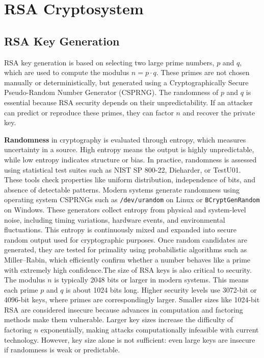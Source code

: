 \chapter{RSA Cryptosystem}
\section{RSA Key Generation }
RSA key generation is based on selecting two large prime numbers, \( p \) and \( q \), which are used to compute the modulus \( n = p \cdot q \). These primes are not chosen manually or deterministically, but generated using a Cryptographically Secure Pseudo-Random Number Generator (CSPRNG). The randomness of \( p \) and \( q \) is essential because RSA security depends on their unpredictability. If an attacker can predict or reproduce these primes, they can factor \( n \) and recover the private key.

\textbf{Randomness} in cryptography is evaluated through entropy, which measures uncertainty in a source. High entropy means the output is highly unpredictable, while low entropy indicates structure or bias. In practice, randomness is assessed using statistical test suites such as NIST SP 800-22, Dieharder, or TestU01. These tools check properties like uniform distribution, independence of bits, and absence of detectable patterns.
Modern systems generate randomness using operating system CSPRNGs  such as \texttt{/dev/urandom} on Linux or \texttt{BCryptGenRandom} on Windows. These generators collect entropy from physical and system-level noise, including timing variations, hardware events, and environmental fluctuations. This entropy is continuously mixed and expanded into secure random output used for cryptographic purposes.
Once random candidates are generated, they are tested for primality using probabilistic algorithms such as Miller–Rabin, which efficiently confirm whether a number behaves like a prime with extremely high confidence.The size of RSA keys is also critical to security. The modulus \( n \) is typically 2048 bits or larger in modern systems. This means each prime \( p \) and \( q \) is about 1024 bits long. Higher security levels use 3072-bit or 4096-bit keys, where primes are correspondingly larger. Smaller sizes like 1024-bit RSA are considered insecure because advances in computation and factoring methods make them vulnerable.
Larger key sizes increase the difficulty of factoring \( n \) exponentially, making attacks computationally infeasible with current technology. However, key size alone is not sufficient: even large keys are insecure if randomness is weak or predictable.

